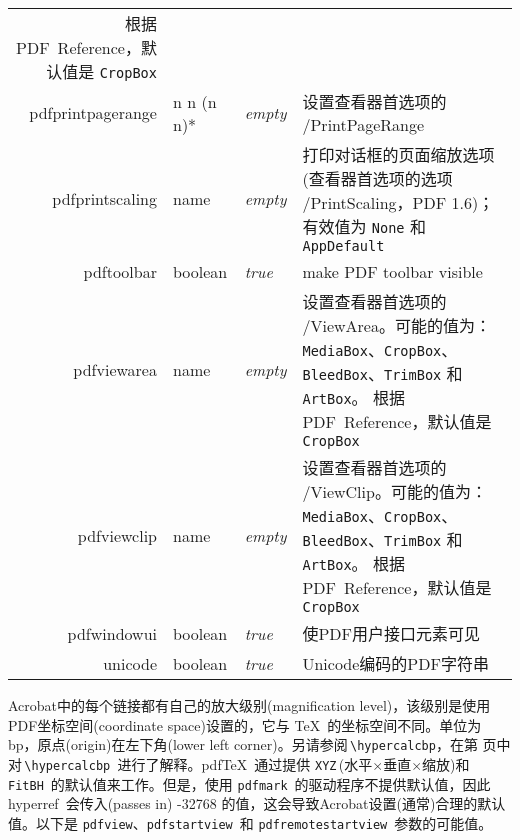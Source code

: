 \documentclass{article}
\begin{document}
\begin{longtable}{@{}>{\ttfamily}r>{\raggedright}p{}>{\itshape}lp{7cm}@{}}
                                       根据PDF~Reference，默认值是 \verb|CropBox|\\
pdfprintpagerange  & n n (n n)*
                             & empty & 设置查看器首选项的 /PrintPageRange\\
pdfprintscaling    & name    & empty & 打印对话框的页面缩放选项(查看器首选项的选项 /PrintScaling，PDF 1.6)；有效值为 \verb|None| 和 \verb|AppDefault| \\
pdftoolbar         & boolean & true  & make PDF toolbar visible \\
pdfviewarea        & name    & empty & 设置查看器首选项的 /ViewArea。可能的值为：
                                       \verb|MediaBox|、\verb|CropBox|、
                                       \verb|BleedBox|、\verb|TrimBox| 和 \verb|ArtBox|。
                                       根据PDF~Reference，默认值是 \verb|CropBox| \\
pdfviewclip        & name    & empty & 设置查看器首选项的 /ViewClip。可能的值为：
                                       \verb|MediaBox|、\verb|CropBox|、
                                       \verb|BleedBox|、\verb|TrimBox| 和 \verb|ArtBox|。
                                       根据PDF~Reference，默认值是 \verb|CropBox| \\
pdfwindowui        & boolean & true  & 使PDF用户接口元素可见\\
unicode            & boolean & true & Unicode编码的PDF字符串 \\
\end{longtable}

Acrobat中的每个链接都有自己的放大级别(magnification level)，该级别是使用PDF坐标空间(coordinate space)设置的，它与 \TeX\ 的坐标空间不同。单位为 bp，原点(origin)在左下角(lower left corner)。另请参阅\,\verb|\hypercalcbp|，在第\,\pageref{hypercalcbp}\,页中对\,\verb|\hypercalcbp |进行了解释。pdf\TeX\ 通过提供 \texttt{XYZ}\,(水平$\times$垂直$\times$缩放)和 \texttt{FitBH}\ 的默认值来工作。但是，使用 \texttt{pdfmark}\ 的驱动程序不提供默认值，因此 \textsf{hyperref}\ 会传入(passes in) -32768 的值，这会导致Acrobat设置(通常)合理的默认值。以下是 \texttt{pdfview}、\texttt{pdfstartview}\ 和 \texttt{pdfremotestartview}\ 参数的可能值。
\end{document}
